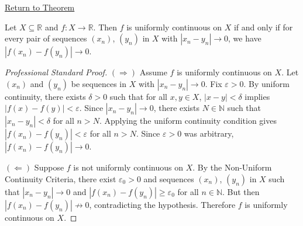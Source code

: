 \newpage
{}
\label{prf:sequential-uniform-continuity}

\begin{remark*}[Return]
\hyperref[prop:sequential-uniform-continuity]{Return to Theorem}
\end{remark*}

\begin{proposition*}
Let $X \subseteq \mathbb{R}$ and $f : X \to \mathbb{R}$.
Then $f$ is uniformly continuous on $X$ if and only if
for every pair of sequences $(x_n)$, $(y_n)$ in $X$ with
$|x_n - y_n| \to 0$, we have $|f(x_n) - f(y_n)| \to 0$.
\end{proposition*}

\begin{proof}[Professional Standard Proof]
\LRAProofBodyStart
$(\Rightarrow)$ Assume $f$ is uniformly continuous on $X$. Let $(x_n)$ and $(y_n)$ be sequences in $X$ with $|x_n - y_n| \to 0$. Fix $\varepsilon > 0$. By uniform continuity, there exists $\delta > 0$ such that for all $x, y \in X$, $|x - y| < \delta$ implies $|f(x) - f(y)| < \varepsilon$. Since $|x_n - y_n| \to 0$, there exists $N \in \mathbb{N}$ such that $|x_n - y_n| < \delta$ for all $n > N$. Applying the uniform continuity condition gives $|f(x_n) - f(y_n)| < \varepsilon$ for all $n > N$. Since $\varepsilon > 0$ was arbitrary, $|f(x_n) - f(y_n)| \to 0$.

$(\Leftarrow)$ Suppose $f$ is not uniformly continuous on $X$. By the Non-Uniform Continuity Criteria, there exist $\varepsilon_0 > 0$ and sequences $(x_n)$, $(y_n)$ in $X$ such that $|x_n - y_n| \to 0$ and $|f(x_n) - f(y_n)| \geq \varepsilon_0$ for all $n \in \mathbb{N}$. But then $|f(x_n) - f(y_n)| \not\to 0$, contradicting the hypothesis. Therefore $f$ is uniformly continuous on $X$.
\end{proof}

